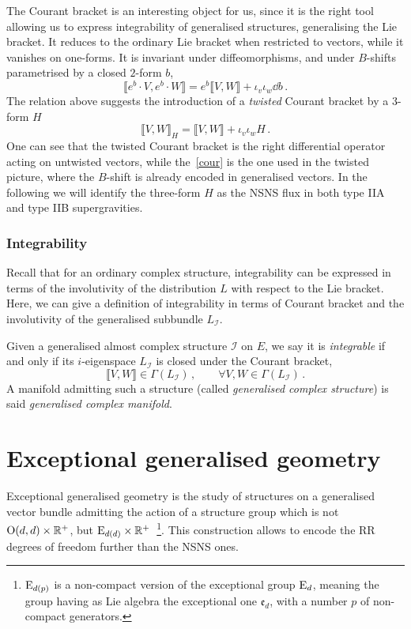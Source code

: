 \documentclass[debug]{phd}
\begin{document}
					The Courant bracket is an interesting object for us, since it is the right tool allowing us to express integrability of generalised structures, generalising the Lie bracket.
					It reduces to the ordinary Lie bracket when restricted to vectors, while it vanishes on one-forms.
					It is invariant under diffeomorphisms, and under $B$-shifts parametrised by a closed $2$-form $b$,
							\begin{equation}\label{bCour}
								\llbracket e^b \cdot V, e^b \cdot W \rrbracket = e^b \llbracket V, W \rrbracket + \iota_v \iota_w \dd b \, .
							\end{equation}
					The relation above suggests the introduction of a \emph{twisted} Courant bracket by a $3$-form $H$
							\begin{equation}\label{HCour}
								\llbracket V, W \rrbracket_H = \llbracket V, W \rrbracket + \iota_v \iota_w H \, .
							\end{equation}
					One can see that the twisted Courant bracket is the right differential operator acting on untwisted vectors, while the~\eqref{cour} is the one used in the twisted picture, where the $B$-shift is already encoded in generalised vectors.
					In the following we will identify the three-form $H$ as the NSNS flux in both type IIA and type IIB supergravities.
				\subsubsection{Integrability}
						Recall that for an ordinary complex structure, integrability can be expressed in terms of the involutivity of the distribution $L$ with respect to the Lie bracket.
						Here, we can give a definition of integrability in terms of Courant bracket and the involutivity of the generalised subbundle $L_\mathcal{I}$.
						
						Given a generalised almost complex structure $\mathcal{I}$ on $E$, we say it is \emph{integrable} if and only if its $i$-eigenspace $L_\mathcal{I}$ is closed under the Courant bracket,
								\begin{equation}
									\llbracket V, W \rrbracket \in \Gamma(L_\mathcal{I}) \, , \qquad \forall V, W \in \Gamma(L_\mathcal{I}) \, .
								\end{equation}
						A manifold admitting such a structure (called \emph{generalised complex structure}) is said \emph{generalised complex manifold}.
		\section{Exceptional generalised geometry}
			Exceptional generalised geometry is the study of structures on a generalised vector bundle admitting the action of a structure group which is not $\mathrm{O}(d,d) \times \mathbb{R}^+$, but $\mathrm{E}_{d(d)} \times \mathbb{R}^+$~\cite{hull1, waldram5, waldram2}\footnote{%
				$\mathrm{E}_{d(p)}$ is a non-compact version of the exceptional group $\mathrm{E}_d$, meaning the group having as Lie algebra the exceptional one $\mathfrak{e}_d$, with a number $p$ of non-compact generators.}. 
			This construction allows to encode the RR degrees of freedom further than the NSNS ones.
			
\end{document}
